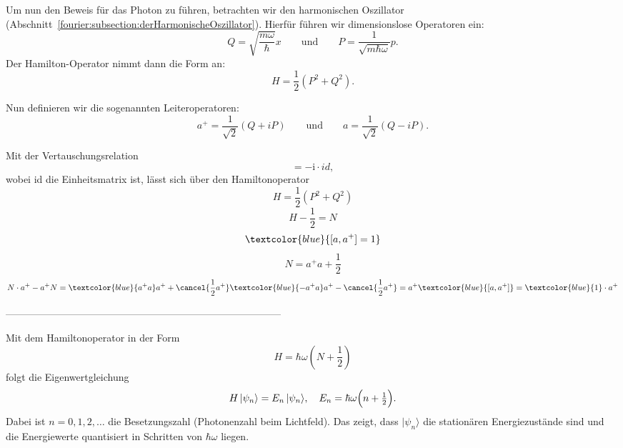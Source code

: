 Um nun den Beweis für das Photon zu führen, betrachten wir den harmonischen Oszillator (Abschnitt~\ref{fourier:subsection:derHarmonischeOszillator}).
Hierfür führen wir dimensionslose Operatoren ein:
\[ 
Q = \sqrt{\frac{m\omega}{\hbar}}x
\qquad\text{und}\qquad
P = \frac{1}{\sqrt{m\hbar\omega}}p.
\]
Der Hamilton-Operator nimmt dann die Form an:
\begin{equation}
	H = \frac{1}{2}(P^2 + Q^2).
\end{equation}

Nun definieren wir die sogenannten Leiteroperatoren:
\[
a^{+} = \frac{1}{\sqrt{2}}(Q + iP)
\qquad\text{und}\qquad
a = \frac{1}{\sqrt{2}}(Q - iP).
\]

Mit der Vertauschungsrelation
\begin{equation}
	[P,Q] = -\mathrm{i} \cdot id,
\end{equation}
wobei id die Einheitsmatrix ist, lässt sich über den Hamiltonoperator %
\begin{equation}
	H = \frac{1}{2}(P^2+Q^2)
\end{equation}
\begin{equation}
	H - \frac{1}{2} = N
\end{equation}
\begin{equation}
	\textcolor{blue}{[a, a^+] = 1}
\end{equation}
\begin{equation}
	N = a^+a + \frac{1}{2}
\end{equation}
\begin{equation}
	N\cdot a^+ - a^+N 
	= \textcolor{blue}{a^+a}a^+ + \cancel{\frac{1}{2}a^+} \textcolor{blue}{-a^+a}a^+ - \cancel{\frac{1}{2}a^+}
	= a^+\textcolor{blue}{[a, a^+]}
	= \textcolor{blue}{1}\cdot a^+
\end{equation}




-----------------------------------------------------------------------------------

Mit dem Hamiltonoperator in der Form
\begin{equation}
	H = \hbar\omega(N + \frac{1}{2})
\end{equation}
folgt die Eigenwertgleichung
\begin{equation}
	H\,|\psi_n\rangle = E_n\,|\psi_n\rangle,
  	\quad
	E_n = \hbar\omega\Bigl(n + \tfrac12\Bigr).
\end{equation}
Dabei ist $n = 0,1,2,\dots$ die Besetzungszahl (Photonenzahl beim Lichtfeld).
Das zeigt, dass $|\psi_n\rangle$ die stationären Energiezustände sind und die Energiewerte quantisiert in Schritten von $\hbar\omega$ liegen.

